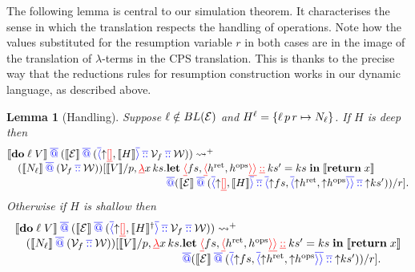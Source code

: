 \documentclass[12pt,phd,lfcs,twoside,openright,logo,leftchapter,normalheadings]{infthesis}
\theoremstyle{plain}
\newtheorem{lemma}[theorem]{Lemma}
\theoremstyle{definition}
\begin{document}
The following lemma is central to our simulation theorem. It
characterises the sense in which the translation respects the handling
of operations.  Note how the values substituted for the resumption
variable $r$ in both cases are in the image of the translation of
$\lambda$-terms in the CPS translation. This is thanks to the precise
way that the reductions rules for resumption construction works in our
dynamic language, as described above.
%
\begin{lemma}[Handling]\label{lem:handle-op-gen-cont-proof}
  Suppose $\ell \notin BL(\mathcal{E})$ and
  $H^{\ell} = \{\ell\,p\,r \mapsto N_\ell\}$. If $H$ is deep then
  \[
    \bl
    \cps{\Do\;\ell\;V} \sapp (\cps{\EC} \sapp (\sRecord{\snil, \cps{H}} \scons \sV_f \scons \sW)) \reducesto^+ \\
    \quad (\cps{N_\ell} \sapp (\sV_f \scons \sW))
    [\cps{V}/p,
    \dlam x\,\dhk.\bl
    \Let\;\dRecord{fs, \dRecord{\vhret, \vhops}} \dcons \dhk' = \dhk\;\In\;
    \cps{\Return\;x}\\
    \sapp (\cps{\EC} \sapp (\sRecord{\snil, \cps{H}} \scons \sRecord{\reflect \dlk, \sRecord{\reflect \vhret, \reflect \vhops}} \scons \reflect\dhk'))/r]. \\
    \el\\
    \el
  \]
  Otherwise if $H$ is shallow then
    \[
   \bl
    \cps{\Do\;\ell\;V} \sapp (\cps{\EC} \sapp (\sRecord{\snil, \cps{H}^\dagger} \scons \sV_f \scons \sW)) \reducesto^+ \\
    \quad (\cps{N_\ell} \sapp (\sV_f \scons \sW))
    [\cps{V}/p, \dlam x\,\dhk.  \bl
    \Let\;\dRecord{\dlk, \dRecord{\vhret, \vhops}} \dcons \dhk' = \dhk \;\In\;\cps{\Return\;x}\\
    \sapp (\cps{\EC} \sapp (\sRecord{\reflect \dlk, \sRecord{\reflect \vhret, \reflect \vhops}} \scons \reflect\dhk'))/r]. \\
    \el \\
    \el
  \]
\end{lemma}
\end{document}
